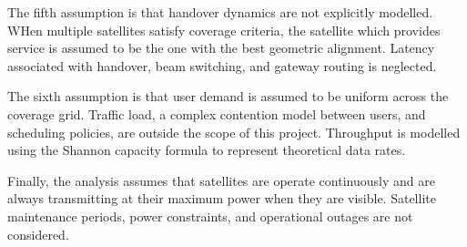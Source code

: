 The fifth assumption is that handover dynamics are not explicitly modelled. WHen multiple satellites satisfy coverage criteria, the satellite which provides service is assumed to be the one with the best geometric alignment. Latency associated with handover, beam switching, and gateway routing is neglected. 

The sixth assumption is that user demand is assumed to be uniform across the coverage grid. Traffic load, a complex contention model between users, and scheduling policies, are outside the scope of this project. Throughput is modelled using the Shannon capacity formula to represent theoretical data rates. 

Finally, the analysis assumes that satellites are operate continuously and are always transmitting at their maximum power when they are visible. Satellite maintenance periods, power constraints, and operational outages are not considered.